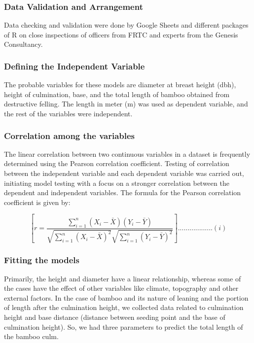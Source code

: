 \documentclass[preprint, 3p,
authoryear]{elsarticle} %
\begin{document}
\hypertarget{data-validation-and-arrangement}{%
\subsubsection{Data Validation and
Arrangement}\label{data-validation-and-arrangement}}

Data checking and validation were done by Google Sheets and different
packages of R on close inspections of officers from FRTC and experts
from the Genesis Consultancy.

\hypertarget{defining-the-independent-variable}{%
\subsubsection{Defining the Independent
Variable}\label{defining-the-independent-variable}}

The probable variables for these models are diameter at breast height
(dbh), height of culmination, base, and the total length of bamboo
obtained from destructive felling. The length in meter (m) was used as
dependent variable, and the rest of the variables were independent.

\hypertarget{correlation-among-the-variables}{%
\subsubsection{Correlation among the
variables}\label{correlation-among-the-variables}}

The linear correlation between two continuous variables in a dataset is
frequently determined using the Pearson correlation coefficient. Testing
of correlation between the independent variable and each dependent
variable was carried out, initiating model testing with a focus on a
stronger correlation between the dependent and independent variables.
The formula for the Pearson correlation coefficient is given by:

\[[ r = \frac{{\sum_{i=1}^{n} (X_i - \bar{X})(Y_i - \bar{Y})}}{{\sqrt{\sum_{i=1}^{n} (X_i - \bar{X})^2} \sqrt{\sum_{i=1}^{n} (Y_i - \bar{Y})^2}}} ]..................                          (i)\]

\hypertarget{fitting-the-models}{%
\subsubsection{Fitting the models}\label{fitting-the-models}}

Primarily, the height and diameter have a linear relationship, whereas
some of the cases have the effect of other variables like climate,
topography and other external factors. In the case of bamboo and its
nature of leaning and the portion of length after the culmination
height, we collected data related to culmination height and base
distance (distance between seeding point and the base of culmination
height). So, we had three parameters to predict the total length of the
bamboo culm.
\end{document}
